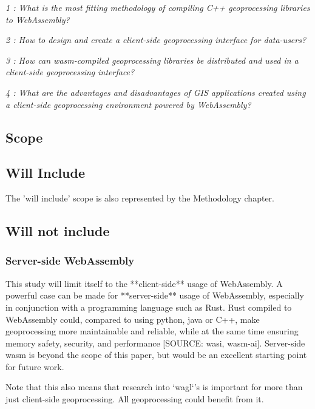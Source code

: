 \textit{1 : What is the most fitting methodology of compiling C++ geoprocessing libraries to WebAssembly?}

\textit{2 : How to design and create a client-side geoprocessing interface for data-users?}

\textit{3 : How can wasm-compiled geoprocessing libraries be distributed and used in a client-side geoprocessing interface?}

\textit{4 : What are the advantages and disadvantages of GIS applications created using a client-side geoprocessing environment powered by WebAssembly?}

\newpage
\subsection{Scope}


\subsection*{Will Include}

The 'will include' scope is also represented by the Methodology chapter. 

\subsection*{Will not include}

\subsubsection*{Server-side WebAssembly} %

This study will limit itself to the **client-side** usage of WebAssembly. 
A powerful case can be made for **server-side** usage of WebAssembly, especially in conjunction with a programming language such as Rust. 
Rust compiled to WebAssembly could, compared to using python, java or C++, make geoprocessing more maintainable and reliable, while at the same time ensuring memory safety, security, and performance [SOURCE: wasi, wasm-ai]. 
Server-side wasm is beyond the scope of this paper, but would be an excellent starting point for future work. 

Note that this also means that research into `wagl`'s is important for more than just client-side geoprocessing. All geoprocessing could benefit from it.



